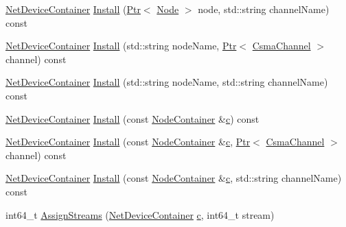 \begin{DoxyCompactItemize}
\item 
\hyperlink{classns3_1_1NetDeviceContainer}{Net\+Device\+Container} \hyperlink{classns3_1_1CsmaHelper_aa89cbdedb63b5a2be29144b00f672561}{Install} (\hyperlink{classns3_1_1Ptr}{Ptr}$<$ \hyperlink{classns3_1_1Node}{Node} $>$ node, std\+::string channel\+Name) const 
\item 
\hyperlink{classns3_1_1NetDeviceContainer}{Net\+Device\+Container} \hyperlink{classns3_1_1CsmaHelper_a47e52d7f9d65ab4791b3801ca4a7d9ae}{Install} (std\+::string node\+Name, \hyperlink{classns3_1_1Ptr}{Ptr}$<$ \hyperlink{classns3_1_1CsmaChannel}{Csma\+Channel} $>$ channel) const 
\item 
\hyperlink{classns3_1_1NetDeviceContainer}{Net\+Device\+Container} \hyperlink{classns3_1_1CsmaHelper_a7da4f267ce8a6e244adf32fc0a5ef459}{Install} (std\+::string node\+Name, std\+::string channel\+Name) const 
\item 
\hyperlink{classns3_1_1NetDeviceContainer}{Net\+Device\+Container} \hyperlink{classns3_1_1CsmaHelper_a2c620d158673aa4ac164d3598a5cce5e}{Install} (const \hyperlink{classns3_1_1NodeContainer}{Node\+Container} \&\hyperlink{mmwave_2model_2fading-traces_2fading__trace__generator_8m_ae0323a9039add2978bf5b49550572c7c}{c}) const 
\item 
\hyperlink{classns3_1_1NetDeviceContainer}{Net\+Device\+Container} \hyperlink{classns3_1_1CsmaHelper_a995e2815d5590b2a8538ff1413aaeda1}{Install} (const \hyperlink{classns3_1_1NodeContainer}{Node\+Container} \&\hyperlink{mmwave_2model_2fading-traces_2fading__trace__generator_8m_ae0323a9039add2978bf5b49550572c7c}{c}, \hyperlink{classns3_1_1Ptr}{Ptr}$<$ \hyperlink{classns3_1_1CsmaChannel}{Csma\+Channel} $>$ channel) const 
\item 
\hyperlink{classns3_1_1NetDeviceContainer}{Net\+Device\+Container} \hyperlink{classns3_1_1CsmaHelper_a6e606d2b547050c6dc222831fb72ee2d}{Install} (const \hyperlink{classns3_1_1NodeContainer}{Node\+Container} \&\hyperlink{mmwave_2model_2fading-traces_2fading__trace__generator_8m_ae0323a9039add2978bf5b49550572c7c}{c}, std\+::string channel\+Name) const 
\item 
int64\+\_\+t \hyperlink{classns3_1_1CsmaHelper_aa1035ef9d1962a37b9c1f3535a5b1491}{Assign\+Streams} (\hyperlink{classns3_1_1NetDeviceContainer}{Net\+Device\+Container} \hyperlink{mmwave_2model_2fading-traces_2fading__trace__generator_8m_ae0323a9039add2978bf5b49550572c7c}{c}, int64\+\_\+t stream)
\end{DoxyCompactItemize}
